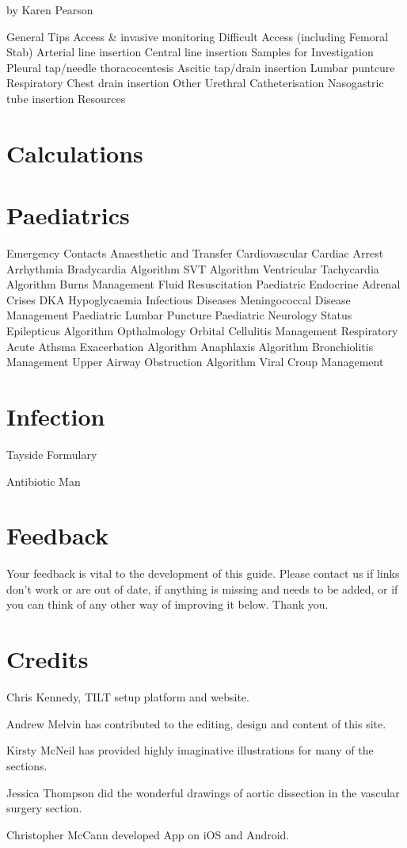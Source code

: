 \documentclass[]{book}
\begin{document}
by Karen Pearson

General Tips
Access \& invasive monitoring
Difficult Access (including Femoral Stab)
Arterial line insertion
Central line insertion
Samples for Investigation
Pleural tap/needle thoracocentesis
Ascitic tap/drain insertion
Lumbar puntcure
Respiratory
Chest drain insertion
Other
Urethral Catheterisation
Nasogastric tube insertion
Resources

\hypertarget{calc}{%
\chapter{Calculations}\label{calc}}

\hypertarget{paeds}{%
\chapter{Paediatrics}\label{paeds}}

Emergency Contacts
Anaesthetic and Transfer
Cardiovascular
Cardiac Arrest
Arrhythmia
Bradycardia Algorithm
SVT Algorithm
Ventricular Tachycardia Algorithm
Burns Management
Fluid Resuscitation
Paediatric Endocrine
Adrenal Crises
DKA
Hypoglycaemia
Infectious Diseases
Meningococcal Disease Management
Paediatric Lumbar Puncture
Paediatric Neurology
Status Epilepticus Algorithm
Opthalmology
Orbital Cellulitis Management
Respiratory
Acute Athsma Exacerbation Algorithm
Anaphlaxis Algorithm
Bronchiolitis Management
Upper Airway Obstruction Algorithm
Viral Croup Management

\hypertarget{infection}{%
\chapter{Infection}\label{infection}}

Tayside Formulary

Antibiotic Man

\hypertarget{feedback}{%
\chapter{Feedback}\label{feedback}}

Your feedback is vital to the development of this guide. Please contact us if links don't work or are out of date, if anything is missing and needs to be added, or if you can think of any other way of improving it below. Thank you.

\hypertarget{credits}{%
\chapter{Credits}\label{credits}}

Chris Kennedy, TILT setup platform and website.

Andrew Melvin has contributed to the editing, design and content of this site.

Kirsty McNeil has provided highly imaginative illustrations for many of the sections.

Jessica Thompson did the wonderful drawings of aortic dissection in the vascular surgery section.

Christopher McCann developed App on iOS and Android.


\end{document}
